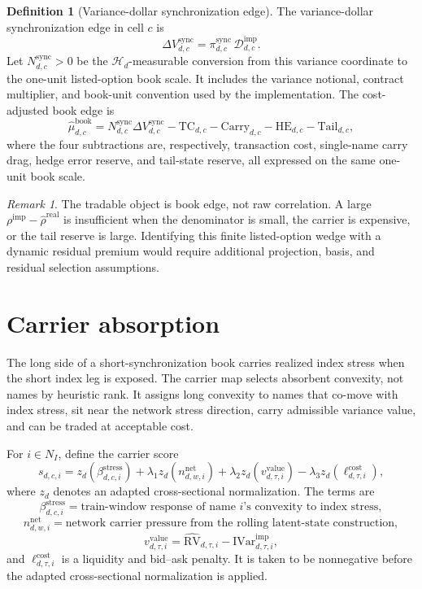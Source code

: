 \documentclass[11pt,a4paper]{amsart}
\theoremstyle{plain}
\theoremstyle{definition}
\newtheorem{definition}[theorem]{Definition}
\theoremstyle{remark}
\newtheorem{remark}[theorem]{Remark}
\newcommand{\cD}{\mathcal{D}}
\newcommand{\cH}{\mathcal{H}}
\begin{document}
\begin{definition}[Variance-dollar synchronization edge]\label{def:sync-edge}
The variance-dollar synchronization edge in cell \(c\) is
\[
        \Delta V_{d,c}^{\mathrm{sync}}
        =
        \pi_{d,c}^{\mathrm{sync}}\,\cD_{d,c}^{\mathrm{imp}}.
\]
Let \(N_{d,c}^{\mathrm{sync}}>0\) be the \(\cH_d\)-measurable conversion from this variance
coordinate to the one-unit listed-option book scale.  It includes the variance notional,
contract multiplier, and book-unit convention used by the implementation.
The cost-adjusted book edge is
\[
        \widehat\mu_{d,c}^{\mathrm{book}}
        =
        N_{d,c}^{\mathrm{sync}}\Delta V_{d,c}^{\mathrm{sync}}
        -\mathrm{TC}_{d,c}
        -\mathrm{Carry}_{d,c}
        -\mathrm{HE}_{d,c}
        -\mathrm{Tail}_{d,c},
\]
where the four subtractions are, respectively, transaction cost, single-name carry drag, hedge
error reserve, and tail-state reserve, all expressed on the same one-unit book scale.
\end{definition}

\begin{remark}
The tradable object is book edge, not raw correlation.  A large
\(\rho^{\mathrm{imp}}-\widehat\rho^{\mathrm{real}}\) is insufficient when the denominator is small,
the carrier is expensive, or the tail reserve is large.  Identifying this finite listed-option
wedge with a dynamic residual premium would require additional projection, basis, and residual
selection assumptions.
\end{remark}

\section{Carrier absorption}\label{sec:carrier}

The long side of a short-synchronization book carries realized index stress when the short index
leg is exposed.  The carrier map selects absorbent convexity, not names by heuristic rank.  It
assigns long convexity to names that co-move with index stress, sit near the network stress
direction, carry admissible variance value, and can be traded at acceptable cost.

For \(i\in N_I\), define the carrier score
\[
        s_{d,c,i}
        =
        z_d\!\left(\beta_{d,c,i}^{\mathrm{stress}}\right)
        +\lambda_1 z_d\!\left(n_{d,w,i}^{\mathrm{net}}\right)
        +\lambda_2 z_d\!\left(v_{d,\tau,i}^{\mathrm{value}}\right)
        -\lambda_3 z_d\!\left(\ell_{d,\tau,i}^{\mathrm{cost}}\right),
\]
where \(z_d\) denotes an adapted cross-sectional normalization.  The terms are
\[
        \beta_{d,c,i}^{\mathrm{stress}}
        =
        \text{train-window response of name \(i\)'s convexity to index stress},
\]
\[
        n_{d,w,i}^{\mathrm{net}}
        =
        \text{network carrier pressure from the rolling latent-state construction},
\]
\[
        v_{d,\tau,i}^{\mathrm{value}}
        =
        \widehat{\mathrm{RV}}_{d,\tau,i}-\mathrm{IVar}_{d,\tau,i}^{\mathrm{imp}},
\]
and \(\ell_{d,\tau,i}^{\mathrm{cost}}\) is a liquidity and bid--ask penalty.  It is taken to be
nonnegative before the adapted cross-sectional normalization is applied.
\end{document}

